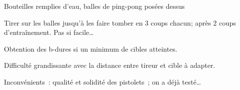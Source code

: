 \documentclass{grand-jeu}
\begin{document}
\begin{liste-materiel}
\end{liste-materiel}

\begin{installation}
Bouteilles remplies d'eau, balles de ping-pong posées dessus
\end{installation}

\begin{regles}
Tirer sur les balles jusqu’à les faire tomber en 3 coups chacun; après 2 coups d’entraînement. Pas si facile…

Obtention des b-dures si un minimum de cibles atteintes. 

Difficulté grandissante avec la distance entre tireur et cible à adapter.

Inconvénients : qualité et solidité des pistolets ; on a déjà testé…
\end{regles}

\begin{imaginaire}

\end{imaginaire}

\begin{moments-stop}
\end{moments-stop}
\end{document}
